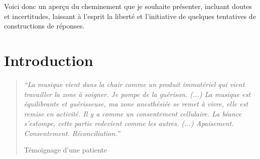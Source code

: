  Voici donc un aperçu du cheminement que je souhaite présenter, incluant doutes et incertitudes,
  laissant à l'esprit la liberté et l'initiative de quelques tentatives de constructions de réponses.


\chapter{Introduction}





\begin{quotation}
 \textit{``La musique vient dans la chair comme un produit immatériel
 qui vient travailler la zone à soigner. Je pompe de la
 guérison.
 (...)
 La musique est équilibrante et guérisseuse, ma zone
 anesthésiée se remet à vivre, elle est remise en activité.
 Il y a comme un consentement cellulaire.
La béance s'estompe, cette
partie redevient comme les autres. (...)
Apaisement. Consentement. Réconciliation.''}

Témoignage d'une patiente

\end{quotation}



